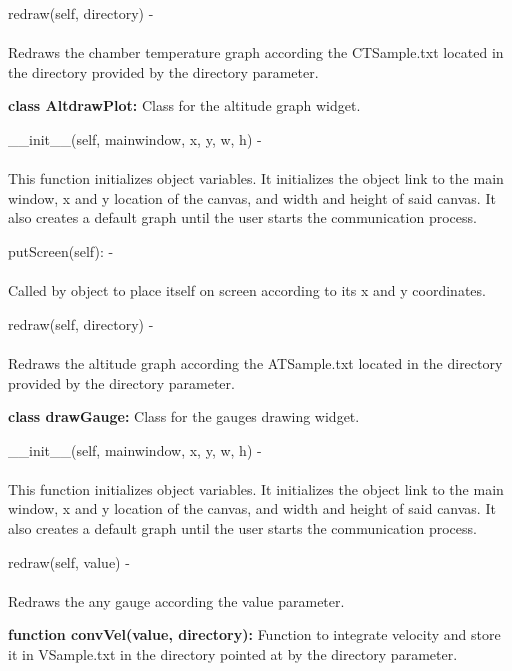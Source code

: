 \documentclass[10pt,draftclsnofoot,onecolumn,compsoc]{IEEEtran}
\begin{document}
redraw(self, directory) - \\ \\
Redraws the chamber temperature graph according the CTSample.txt located in the directory provided by the directory parameter. \par

{\bf class AltdrawPlot: }  Class for the altitude graph widget. \par

\_\_init\_\_(self, mainwindow, x, y, w, h) - \\ \\
This function initializes object variables. It initializes the object link to the main window, x and y location of the canvas, and width and height of said canvas. It also creates a default graph until the user starts the communication process. \par

putScreen(self): - \\ \\
Called by object to place itself on screen according to its x and y coordinates. \par

redraw(self, directory) - \\ \\
Redraws the altitude graph according the ATSample.txt located in the directory provided by the directory parameter. \par

{\bf class drawGauge: }  Class for the gauges drawing widget. \par

\_\_init\_\_(self, mainwindow, x, y, w, h) - \\ \\
This function initializes object variables. It initializes the object link to the main window, x and y location of the canvas, and width and height of said canvas. It also creates a default graph until the user starts the communication process. \par

redraw(self, value) - \\ \\
Redraws the any gauge according the value parameter. \par

{\bf function convVel(value, directory): }  Function to integrate velocity and store it in VSample.txt in the directory pointed at by the directory parameter. \par
\end{document}
